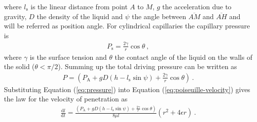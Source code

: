 \documentclass[aip, amsmath, amssymb, reprint, twocolumn, floatfix]{revtex4-1}
\newcommand{\dldt}{\frac{\mathrm{d}l}{\mathrm{d}t}}
\newcommand{\Pa}{P_\mathrm{A}}
\newcommand{\Pt}{P}
\newcommand{\Ps}{P_\mathrm{s}}
\newcommand{\ls}{l_\mathrm{s}}
\begin{document}
where $\ls$ is the linear distance from point $A$ to $M$, $g$ the acceleration due to gravity, $D$ the density of the liquid and $\psi$ the angle between $\overline{AM}$ and $\overline{AH}$ and will be referred as position angle. For cylindrical capillaries the capillary pressure is 
\begin{gather}
	\Ps = \frac{2\gamma}{r}\cos \theta~,
	\label{eq:capillary-pressure}
\end{gather}
where $\gamma$ is the surface tension and $\theta$ the contact angle of the liquid on the walls of the solid ($\theta < \pi/2$). Summing up the total driving pressure can be written as
\begin{gather}
	\Pt = \left(\Pa + gD (h - \ls \sin \psi) + \frac{2\gamma}{r}\cos \theta\right)~.
	\label{eq:pressure}
\end{gather}
Substituting Equation (\ref{eq:pressure}) into Equation (\ref{eq:poiseuille-velocity}) gives the law for the velocity of penetration as 
\begin{gather}
	\dldt = \frac{\left(\Pa + gD (h - \ls \sin \psi) + \frac{2\gamma}{r}\cos \theta\right)}{8\mu l}\left(r^2 + 4\epsilon r \right)~.
	\label{eq:poiseuille-velocity-pressure}
\end{gather}
\bigskip
\end{document}
